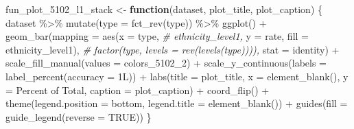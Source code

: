 \documentclass[
]{article}
\newenvironment{Shaded}{\begin{snugshade}}{\end{snugshade}}
\newcommand{\AttributeTok}[1]{\textcolor[rgb]{0.77,0.63,0.00}{#1}}
\newcommand{\CommentTok}[1]{\textcolor[rgb]{0.56,0.35,0.01}{\textit{#1}}}
\newcommand{\ConstantTok}[1]{\textcolor[rgb]{0.00,0.00,0.00}{#1}}
\newcommand{\ControlFlowTok}[1]{\textcolor[rgb]{0.13,0.29,0.53}{\textbf{#1}}}
\newcommand{\FunctionTok}[1]{\textcolor[rgb]{0.00,0.00,0.00}{#1}}
\newcommand{\NormalTok}[1]{#1}
\newcommand{\OtherTok}[1]{\textcolor[rgb]{0.56,0.35,0.01}{#1}}
\newcommand{\SpecialCharTok}[1]{\textcolor[rgb]{0.00,0.00,0.00}{#1}}
\newcommand{\StringTok}[1]{\textcolor[rgb]{0.31,0.60,0.02}{#1}}
\begin{document}
\begin{Shaded}
\begin{Highlighting}[]
\NormalTok{fun\_plot\_5102\_l1\_stack }\OtherTok{\textless{}{-}} \ControlFlowTok{function}\NormalTok{(dataset, plot\_title, plot\_caption) \{}
\NormalTok{    dataset }\SpecialCharTok{\%\textgreater{}\%} 
        \FunctionTok{mutate}\NormalTok{(}\AttributeTok{type =} \FunctionTok{fct\_rev}\NormalTok{(type)) }\SpecialCharTok{\%\textgreater{}\%} 
        \FunctionTok{ggplot}\NormalTok{() }\SpecialCharTok{+}
        \FunctionTok{geom\_bar}\NormalTok{(}\AttributeTok{mapping =} \FunctionTok{aes}\NormalTok{(}\AttributeTok{x =}\NormalTok{ type, }\CommentTok{\# ethnicity\_level1, }
                               \AttributeTok{y =}\NormalTok{ rate, }
                               \AttributeTok{fill =}\NormalTok{ ethnicity\_level1), }\CommentTok{\# factor(type, levels = rev(levels(type)))), }
                 \AttributeTok{stat =} \StringTok{\textquotesingle{}identity\textquotesingle{}}\NormalTok{) }\SpecialCharTok{+}
        \FunctionTok{scale\_fill\_manual}\NormalTok{(}\AttributeTok{values =}\NormalTok{ colors\_5102\_2) }\SpecialCharTok{+}
        \FunctionTok{scale\_y\_continuous}\NormalTok{(}\AttributeTok{labels =} \FunctionTok{label\_percent}\NormalTok{(}\AttributeTok{accuracy =}\NormalTok{ 1L)) }\SpecialCharTok{+}
        \FunctionTok{labs}\NormalTok{(}\AttributeTok{title =}\NormalTok{ plot\_title,}
             \AttributeTok{x =} \FunctionTok{element\_blank}\NormalTok{(),}
             \AttributeTok{y =} \StringTok{\textquotesingle{}Percent of Total\textquotesingle{}}\NormalTok{, }
             \AttributeTok{caption =}\NormalTok{ plot\_caption) }\SpecialCharTok{+} 
        \FunctionTok{coord\_flip}\NormalTok{() }\SpecialCharTok{+} 
        \FunctionTok{theme}\NormalTok{(}\AttributeTok{legend.position =} \StringTok{\textquotesingle{}bottom\textquotesingle{}}\NormalTok{, }
              \AttributeTok{legend.title =} \FunctionTok{element\_blank}\NormalTok{()) }\SpecialCharTok{+}
        \FunctionTok{guides}\NormalTok{(}\AttributeTok{fill =} \FunctionTok{guide\_legend}\NormalTok{(}\AttributeTok{reverse =} \ConstantTok{TRUE}\NormalTok{))}
\NormalTok{\}}



\end{Highlighting}
\end{Shaded}
\end{document}
